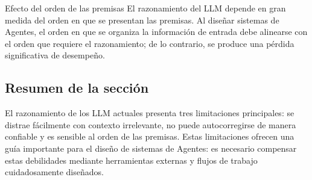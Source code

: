 \begin{warningbox}{Efecto del orden de las premisas}
El razonamiento del LLM depende en gran medida del orden en que se presentan las premisas. Al diseñar sistemas de Agentes, el orden en que se organiza la información de entrada debe alinearse con el orden que requiere el razonamiento; de lo contrario, se produce una pérdida significativa de desempeño.
\end{warningbox}

\subsection{Resumen de la sección}

El razonamiento de los LLM actuales presenta tres limitaciones principales: se distrae fácilmente con contexto irrelevante, no puede autocorregirse de manera confiable y es sensible al orden de las premisas. Estas limitaciones ofrecen una guía importante para el diseño de sistemas de Agentes: es necesario compensar estas debilidades mediante herramientas externas y flujos de trabajo cuidadosamente diseñados.

